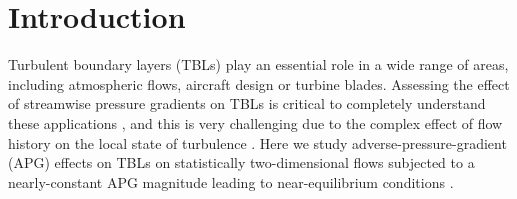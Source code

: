 \section{Introduction}


Turbulent boundary layers (TBLs) play an essential role in a wide range of areas, including atmospheric flows, aircraft design or turbine blades. Assessing the effect of streamwise pressure gradients on TBLs is critical to completely understand these applications \cite{harun_monty2013, Maciel_2018}, and this is very challenging due to the complex effect of flow history on the local state of turbulence \cite{bobke2017, tanarro_2020, Kitsios2017}. Here we study adverse-pressure-gradient (APG) effects on TBLs on statistically two-dimensional flows subjected to a nearly-constant APG magnitude leading to near-equilibrium conditions \cite{Marusic_McKeon_2010, Nagib_2008}.


